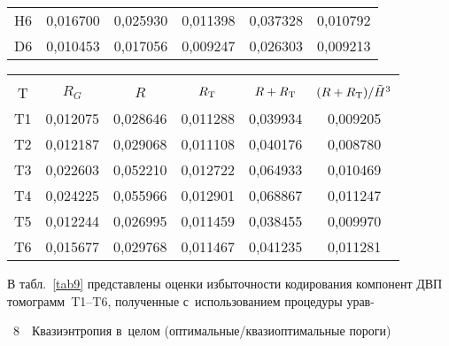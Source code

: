\begin{multicols}{2}
\begin{table*}[b]
\begin{center}
\begin{tabular}{|c|c|c|c|c|c|}
H6 & 0,016700 & 0,025930 & 0,011398 & 0,037328 & 0,010792\\
D6 & 0,010453 & 0,017056 & 0,009247 & 0,026303 & 0,009213\\
\hline
\end{tabular}
\end{center}
\begin{center}
\label{tab10}
\vspace{2ex}

\tabcolsep=10pt
\begin{tabular}{|c|c|c|c|c|c|}
\hline
&&&&&\\[-9pt]
T & $R_G$ &  $R$ & $R_{\rm T}$ & $R+R_{\rm T}$ & $(R+R_{\rm T})/\tilde{H}^3$\\
\hline
T1 & 0,012075 & 0,028646 & 0,011288 & 0,039934 & 0,009205\\
T2 & 0,012187 & 0,029068 & 0,011108 & 0,040176 & 0,008780\\
T3 & 0,022603 & 0,052210 & 0,012722 & 0,064933 & 0,010469\\
T4 & 0,024225 & 0,055966 & 0,012901 & 0,068867 & 0,011247\\
T5 & 0,012244 & 0,026995 & 0,011459 & 0,038455 & 0,009970\\
T6 & 0,015677 & 0,029768 & 0,011467 & 0,041235 & 0,011281\\
\hline
\end{tabular}
\end{center}
\end{table*}

В табл.~\ref{tab9} представлены оценки избыточности кодирования 
компонент ДВП томограмм~T1--T6, полученные с~использованием процедуры 
урав-\linebreak\vspace*{-12pt}

\pagebreak

{\small   %
 \noindent
{{\tablename~8}\ \ \small{Квазиэнтропия в~целом (оптимальные/квазиоптимальные пороги)}}

}
\end{multicols}
